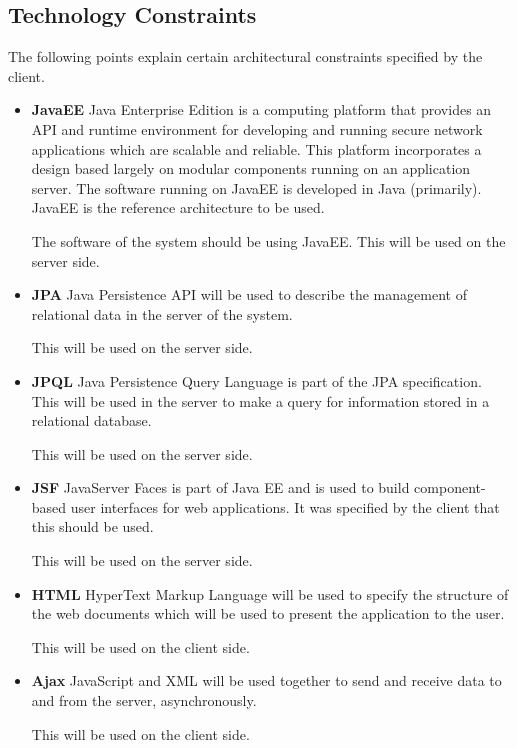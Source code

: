 

\subsection{Technology Constraints}
The following points explain certain architectural constraints specified by the client. 
\begin{itemize}
	\item{\textbf{JavaEE}}
	\newline
	Java Enterprise Edition is a computing platform that provides an API and runtime environment for developing and running secure network applications which are scalable and reliable. This platform incorporates a design based largely on modular components running on an application server. The software running on 					JavaEE is developed in Java (primarily). JavaEE is the reference architecture to be used.

	The software of the system should be using JavaEE. This will be used on the server side.

	\item{\textbf{JPA}}
	\newline
	Java Persistence API will be used to describe the management of relational data in the server of the system.

	This will be used on the server side.

	\item{\textbf{JPQL}}
	\newline
	Java Persistence Query Language is part of the JPA specification. This will be used in the server to make a query for information stored in a relational database.

	This will be used on the server side.

	\item{\textbf{JSF}}
	JavaServer Faces is part of Java EE and is used to build component-based user interfaces for web applications. It was specified by the client that this should be used.

	This will be used on the server side.

	\item{\textbf{HTML}}
	\newline
	HyperText Markup Language will be used to specify the structure of the web documents which will be used to present the application to the user.

	This will be used on the client side.

	\item{\textbf{Ajax}}
	\newline
	JavaScript and XML will be used together to send and receive data to and from the server, asynchronously.

	This will be used on the client side.
\end{itemize}


